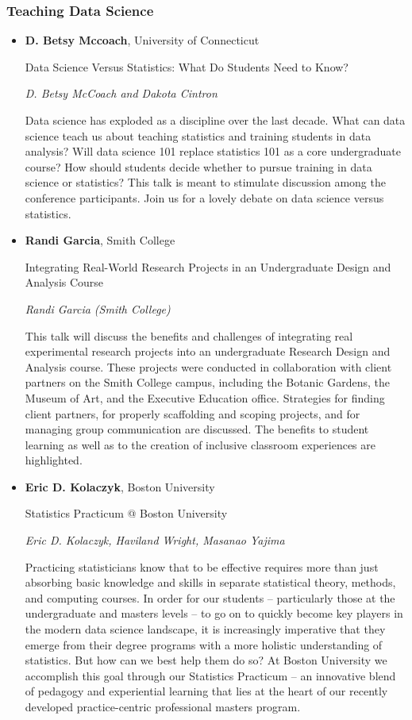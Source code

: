 \subsubsection*{Teaching Data Science}

\begin{itemize}
\item \textbf{D. Betsy Mccoach}, University of Connecticut

Data Science Versus Statistics: What Do Students Need to Know?

\emph{\footnotesize D. Betsy McCoach and Dakota Cintron}

Data science has exploded as a discipline over the last decade. What can data science teach us about teaching statistics and training students in data analysis? Will data science 101 replace statistics 101 as a core undergraduate course? How should students decide whether to pursue training in data science or statistics? This talk is meant to stimulate discussion among the conference participants. Join us for a lovely debate on data science versus statistics.

\item \textbf{Randi Garcia}, Smith College

Integrating Real-World Research Projects in an Undergraduate Design and Analysis Course

\emph{\footnotesize Randi Garcia (Smith College)}

This talk will discuss the benefits and challenges of integrating real experimental research projects into an undergraduate Research Design and Analysis course. These projects were conducted in collaboration with client partners on the Smith College campus, including the Botanic Gardens, the Museum of Art, and the Executive Education office. Strategies for finding client partners, for properly scaffolding and scoping projects, and for managing group communication are discussed. The benefits to student learning as well as to the creation of inclusive classroom experiences are highlighted.

\item \textbf{Eric D. Kolaczyk}, Boston University

Statistics Practicum @ Boston University

\emph{\footnotesize Eric D. Kolaczyk, Haviland Wright, Masanao Yajima}

Practicing statisticians know that to be effective requires more than just absorbing basic knowledge and skills in separate statistical theory, methods, and computing courses.  In order for our students -- particularly those at the undergraduate and masters levels -- to go on to quickly become key players in the modern data science landscape, it is increasingly imperative that they emerge from their degree programs with a more holistic understanding of statistics.  But how can we best help them do so?  At Boston University we accomplish this goal through our Statistics Practicum -- an innovative blend of pedagogy and experiential learning that lies at the heart of our recently developed practice-centric professional masters program.

\end{itemize}

